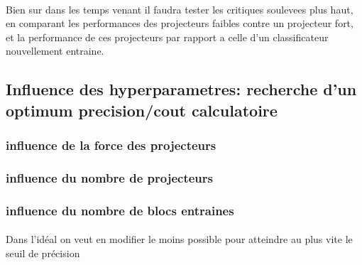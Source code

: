 \documentclass[11 pt]{article}
\begin{document}
\paragraph{}Bien sur dans les temps venant il faudra tester les critiques soulevees plus haut, en comparant les performances des projecteurs faibles contre un projecteur fort, et la performance de ces projecteurs par rapport a celle d'un classificateur nouvellement entraine.


\subsection{Influence des hyperparametres: recherche d'un optimum precision/cout calculatoire}
\subsubsection{influence de la force des projecteurs}
\subsubsection{influence du nombre de projecteurs}
\subsubsection{influence du nombre de blocs entraines}
\paragraph{}Dans l’idéal on veut en modifier le moins possible pour atteindre au plus vite le seuil de précision
\end{document}
